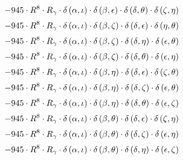 \begin{subequations}
\begin{gather}
 \\[0.2em] \notag 		 - 945 \cdot R^{8} \cdot R_{\gamma{}} \cdot \delta{}\left(\alpha{}, \iota{}\right) \cdot \delta{}\left(\beta{}, \epsilon{}\right) \cdot \delta{}\left(\delta{}, \theta{}\right) \cdot \delta{}\left(\zeta{}, \eta{}\right) 
 \\[0.2em] \notag 		 - 945 \cdot R^{8} \cdot R_{\gamma{}} \cdot \delta{}\left(\alpha{}, \iota{}\right) \cdot \delta{}\left(\beta{}, \zeta{}\right) \cdot \delta{}\left(\delta{}, \epsilon{}\right) \cdot \delta{}\left(\eta{}, \theta{}\right) 
 \\[0.2em] \notag 		 - 945 \cdot R^{8} \cdot R_{\gamma{}} \cdot \delta{}\left(\alpha{}, \iota{}\right) \cdot \delta{}\left(\beta{}, \zeta{}\right) \cdot \delta{}\left(\delta{}, \eta{}\right) \cdot \delta{}\left(\epsilon{}, \theta{}\right) 
 \\[0.2em] \notag 		 - 945 \cdot R^{8} \cdot R_{\gamma{}} \cdot \delta{}\left(\alpha{}, \iota{}\right) \cdot \delta{}\left(\beta{}, \zeta{}\right) \cdot \delta{}\left(\delta{}, \theta{}\right) \cdot \delta{}\left(\epsilon{}, \eta{}\right) 
 \\[0.2em] \notag 		 - 945 \cdot R^{8} \cdot R_{\gamma{}} \cdot \delta{}\left(\alpha{}, \iota{}\right) \cdot \delta{}\left(\beta{}, \eta{}\right) \cdot \delta{}\left(\delta{}, \epsilon{}\right) \cdot \delta{}\left(\zeta{}, \theta{}\right) 
 \\[0.2em] \notag 		 - 945 \cdot R^{8} \cdot R_{\gamma{}} \cdot \delta{}\left(\alpha{}, \iota{}\right) \cdot \delta{}\left(\beta{}, \eta{}\right) \cdot \delta{}\left(\delta{}, \zeta{}\right) \cdot \delta{}\left(\epsilon{}, \theta{}\right) 
 \\[0.2em] \notag 		 - 945 \cdot R^{8} \cdot R_{\gamma{}} \cdot \delta{}\left(\alpha{}, \iota{}\right) \cdot \delta{}\left(\beta{}, \eta{}\right) \cdot \delta{}\left(\delta{}, \theta{}\right) \cdot \delta{}\left(\epsilon{}, \zeta{}\right) 
 \\[0.2em] \notag 		 - 945 \cdot R^{8} \cdot R_{\gamma{}} \cdot \delta{}\left(\alpha{}, \iota{}\right) \cdot \delta{}\left(\beta{}, \theta{}\right) \cdot \delta{}\left(\delta{}, \epsilon{}\right) \cdot \delta{}\left(\zeta{}, \eta{}\right) 
 \\[0.2em] \notag 		 - 945 \cdot R^{8} \cdot R_{\gamma{}} \cdot \delta{}\left(\alpha{}, \iota{}\right) \cdot \delta{}\left(\beta{}, \theta{}\right) \cdot \delta{}\left(\delta{}, \zeta{}\right) \cdot \delta{}\left(\epsilon{}, \eta{}\right) 
 \\[0.2em] \notag 		 - 945 \cdot R^{8} \cdot R_{\gamma{}} \cdot \delta{}\left(\alpha{}, \iota{}\right) \cdot \delta{}\left(\beta{}, \theta{}\right) \cdot \delta{}\left(\delta{}, \eta{}\right) \cdot \delta{}\left(\epsilon{}, \zeta{}\right) 

\end{gather}
\end{subequations}
